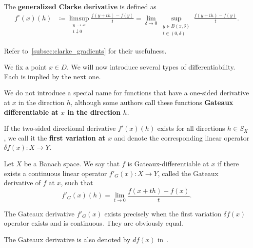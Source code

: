 \begin{definition}
\begin{defenum}
    \cite[Section 10.1]{Clarke2013} The \textbf{generalized Clarke derivative} is defined as
    \begin{align*}
      f^\circ(x)(h)
      &\coloneqq
      \limsup_{\substack{y \to x \\ t \downarrow 0}} \frac {f(y + th) - f(y)} t
      =
      \lim_{\delta \to 0} \sup_{\substack{y \in B(x, \delta) \\ t \in (0, \delta)}} \frac {f(y + th) - f(y)} t.
    \end{align*}

    Refer to~\cref{subsec:clarke_gradients} for their usefulness.
  \end{defenum}
\end{definition}

\begin{definition}\label{def:differentiability}
  We fix a point \( x \in D \). We will now introduce several types of differentiability. Each is implied by the next one.

  \begin{defenum}
    \item We do not introduce a special name for functions that have a one-sided derivative at \( x \) in the direction \( h \), although some authors call these functions \textbf{Gateaux differentiable at \( x \) in the direction \( h \)}. %

    \cite[0.2.1]{Ioffe1974} If the two-sided directional derivative \( f'(x)(h) \) exists for all directions \( h \in S_X \), we call it the \textbf{first variation at \( x \)} and denote the corresponding linear operator \( \delta f(x): X \to Y \).

    \cite[definition 1.12]{Phelps1993} Let \( X \) be a Banach space. We say that \( f \) is Gateaux-differentiable at \( x \) if there exists a continuous linear operator \( f'_G(x): X \to Y \), called the Gateaux derivative of \( f \) at \( x \), such that
    \begin{equation*}
      f'_G(x)(h) = \lim_{t \to 0} \frac {f(x + th) - f(x)} t.
    \end{equation*}

    The Gateaux derivative \( f'_G(x) \) exists precisely when the first variation \( \delta f(x) \) operator exists and is continuous. They are obviously equal.

    The Gateaux derivative is also denoted by \( df(x) \) in~\cite[definition 1.12]{Phelps1993}.


\end{defenum}
\end{definition}
